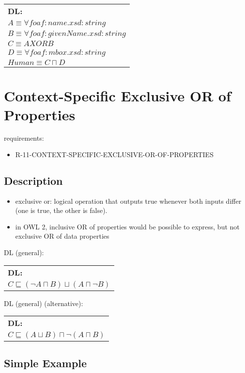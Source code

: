 \documentclass{llncs}
\newenvironment{DL}{
  \scriptsize
  \sffamily
  \vspace{0.3cm}
  \begin{tabular}{l}
	\textbf{DL:} \\

}{
  \end{tabular}
  \linebreak
}
\begin{document}
\begin{DL}
$A \equiv \forall foaf:name . xsd:string$ \\
$B \equiv \forall foaf:givenName . xsd:string$ \\
$C \equiv A XOR B$ \\
$D \equiv \forall foaf:mbox . xsd:string$ \\
$Human \equiv C \sqcap D$ \\
\end{DL}

\section{Context-Specific Exclusive OR of Properties}

requirements:

\begin{itemize}
	\item R-11-CONTEXT-SPECIFIC-EXCLUSIVE-OR-OF-PROPERTIES
\end{itemize}

\subsection{Description}

\begin{itemize}
  \item exclusive or: logical operation that outputs true whenever both inputs differ (one is true, the other is false).
	\item in OWL 2, inclusive OR of properties would be possible to express, but not exclusive OR of data properties
\end{itemize}

DL (general):

\begin{DL}
$C \sqsubseteq (\neg A \sqcap B) \sqcup (A \sqcap \neg B)$ \\
\end{DL}

DL (general) (alternative):

\begin{DL}
$C \sqsubseteq (A \sqcup B) \sqcap \neg(A \sqcap B)$ \\
\end{DL}

\subsection{Simple Example}
\end{document}
